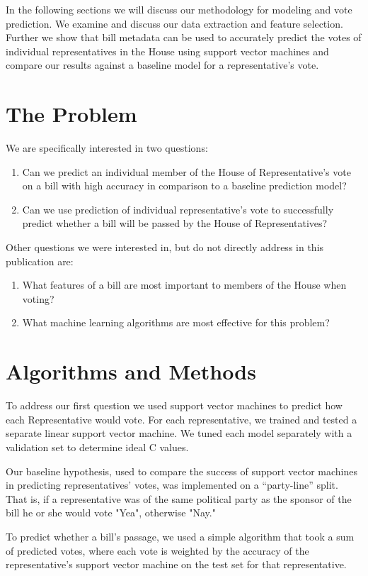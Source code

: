 \documentclass[11pt,letterpaper,twocolumn]{article}
\begin{document}
	In the following sections we will discuss our methodology for modeling and vote prediction. We examine and discuss our data extraction and feature selection. Further we show that bill metadata can be used to accurately predict the votes of individual representatives in the House using support vector machines and compare our results against a baseline model for a representative's vote. 

\section{The Problem}
We are specifically interested in two questions: 
\begin{enumerate}
\item Can we predict an individual member of the House of Representative's vote on a bill with high accuracy in comparison to a baseline prediction model?
\item Can we use prediction of individual representative's vote to successfully predict whether a bill will be passed by the House of Representatives?
\end{enumerate}

\noindent Other questions we were interested in, but do not directly address in this publication are:

\begin{enumerate}
\item What features of a bill are most important to members of the House when voting?
\item What machine learning algorithms are most effective for this problem?
\end{enumerate}

\section{Algorithms and Methods}
To address our first question we used support vector machines to predict how each Representative would vote. For each representative, we trained and tested a separate linear support vector machine. We tuned each model separately with a validation set to determine ideal C values. 

Our baseline hypothesis, used to compare the success of support vector machines in predicting representatives' votes, was implemented on a ``party-line'' split. That is, if a representative was of the same political party as the sponsor of the bill he or she would vote "Yea", otherwise "Nay."

To predict whether a bill's passage, we used a simple algorithm that took a sum of predicted votes, where each vote is weighted by the accuracy of the representative's support vector machine on the test set for that representative. 
\end{document}
